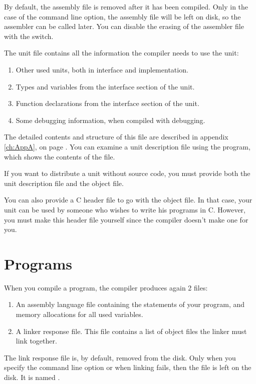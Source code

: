 By default, the assembly file is removed after it has been compiled.
Only in the case of the  command line option, the assembly file
will be left on disk, so the assembler can be called later. You can
disable the erasing of the assembler file with the  switch.

The unit file contains all the information the compiler needs to use the
unit:
\begin{enumerate}
\item Other used units, both in interface and implementation.
\item Types and variables from the interface section of the unit.
\item Function declarations from the interface section of the unit.
\item Some debugging information, when compiled with debugging.
\end{enumerate}

The detailed contents and structure of this file are described in appendix
\ref{ch:AppA}, on page \pageref{ch:AppD}.
You can examine a unit description file using the 
program, which shows the contents of the file.

If you want to distribute a unit without source code, you must provide both
the unit description file and the object file.

You can also provide a C header file to go with the object file. In that
case, your unit can be used by someone who wishes to write his programs in
C. However, you must make this header file yourself since the \fpc compiler
doesn't make one for you.

\section{Programs}
\label{se:Programs}

When you compile a program, the compiler produces again 2 files:
\begin{enumerate}
\item An assembly language file containing the statements of your program,
and memory allocations for all used variables.
\item A linker response file. This file contains a list of object files the
linker must link together.
\end{enumerate}
The link response file is, by default, removed from the disk. Only when you
specify the  command line option or when linking fails, then the file
is left on the disk. It is named .

